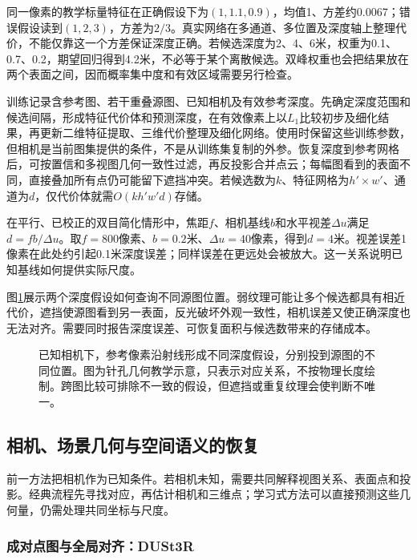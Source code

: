 同一像素的教学标量特征在正确假设下为$(1,1.1,0.9)$，均值1、方差约0.0067；错误假设读到$(1,2,3)$，方差为$2/3$。真实网络在多通道、多位置及深度轴上整理代价，不能仅靠这一个方差保证深度正确。若候选深度为2、4、6米，权重为0.1、0.7、0.2，期望回归得到4.2米，不必等于某个离散候选。双峰权重也会把结果放在两个表面之间，因而概率集中度和有效区域需要另行检查。

训练记录含参考图、若干重叠源图、已知相机及有效参考深度。先确定深度范围和候选间隔，形成特征代价体和预测深度，在有效像素上以$L_1$比较初步及细化结果，再更新二维特征提取、三维代价整理及细化网络。使用时保留这些训练参数，但相机是当前图集提供的条件，不是从训练集复制的外参。恢复深度到参考网格后，可按置信和多视图几何一致性过滤，再反投影合并点云；每幅图看到的表面不同，直接叠加所有点仍可能留下遮挡冲突。若候选数为$k$、特征网格为$h'\times w'$、通道为$d$，仅代价体就需$O(kh'w'd)$存储。

在平行、已校正的双目简化情形中，焦距$f$、相机基线$b$和水平视差$\Delta u$满足$d=fb/\Delta u$。取$f=800$像素、$b=0.2$米、$\Delta u=40$像素，得到$d=4$米。视差误差1像素在此处约引起0.1米深度误差；同样误差在更远处会被放大。这一关系说明已知基线如何提供实际尺度。

图\ref{fig:vision-depth-hypotheses}展示两个深度假设如何查询不同源图位置。弱纹理可能让多个候选都具有相近代价，遮挡使源图看到另一表面，反光破坏外观一致性，相机误差又使正确深度也无法对齐。需要同时报告深度误差、可恢复面积与候选数带来的存储成本。

\begin{figure}[htbp]
 \centering
 
 \caption{已知相机下，参考像素沿射线形成不同深度假设，分别投到源图的不同位置。图为针孔几何教学示意，只表示对应关系，不按物理长度绘制。跨图比较可排除不一致的假设，但遮挡或重复纹理会使判断不唯一。}
 \label{fig:vision-depth-hypotheses}
\end{figure}

\subsection{相机、场景几何与空间语义的恢复}
\label{sec:vision-recognition-geometry}

前一方法把相机作为已知条件。若相机未知，需要共同解释视图关系、表面点和投影。经典流程先寻找对应，再估计相机和三维点；学习式方法可以直接预测这些几何量，仍需处理共同坐标与尺度。

\Needspace{65mm}
\subsubsection{成对点图与全局对齐：DUSt3R}
\label{sec:vision-recognition-dust3r}

